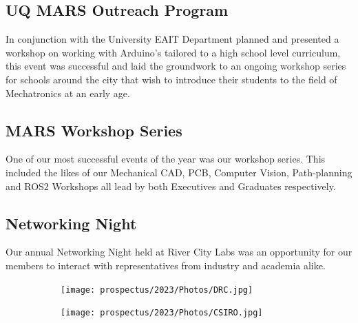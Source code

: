 \documentclass[a4paper,12pt]{report}
\begin{document}
\vspace{-1.8cm}

\subsection{UQ MARS Outreach Program}
In conjunction with the University EAIT Department planned and presented a workshop on working with Arduino's tailored to a high school level curriculum, this event was successful and laid the groundwork to an ongoing workshop series for schools around the city that wish to introduce their students to the field of Mechatronics at an early age.

\vspace{-1.8cm}

\subsection{MARS Workshop Series}
One of our most successful events of the year was our workshop series. This included the likes of our Mechanical CAD, PCB, Computer Vision, Path-planning and ROS2 Workshops all lead by both Executives and Graduates respectively.

\vspace{-1.5cm}

\subsection{Networking Night} 
Our annual Networking Night held at River City Labs was an opportunity for our members to interact with representatives from industry and academia alike.
\begin{figure}[H]
    \centering
    \begin{subfigure}{0.42\linewidth}
        \texttt{[image: prospectus/2023/Photos/DRC.jpg]}
    \end{subfigure}
    \begin{subfigure}{0.42\linewidth}
        \texttt{[image: prospectus/2023/Photos/CSIRO.jpg]}
    \end{subfigure}
\end{figure}
\newpage
\end{document}
